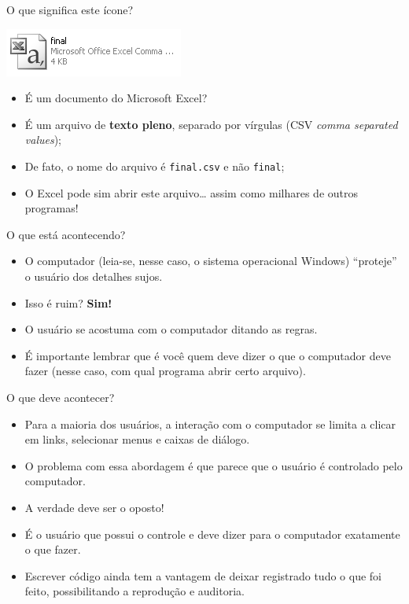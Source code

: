 \documentclass[
  10pt,
  a4paper]{book}
\providecommand{\tightlist}{%
  \setlength{\itemsep}{0pt}\setlength{\parskip}{0pt}}
\begin{document}
O que significa este ícone?

\begin{center}\includegraphics[width=0.5\linewidth]{img/excelcsvgrey} \end{center}

\begin{itemize}
\tightlist
\item
  É um documento do Microsoft Excel?
\item
  É um arquivo de \textbf{texto pleno}, separado por vírgulas (CSV \emph{comma
  separated values});
\item
  De fato, o nome do arquivo é \texttt{final.csv} e não \texttt{final};
\item
  O Excel pode sim abrir este arquivo\ldots{} assim como milhares de outros
  programas!
\end{itemize}

O que está acontecendo?

\begin{itemize}
\tightlist
\item
  O computador (leia-se, nesse caso, o sistema operacional Windows)
  ``proteje'' o usuário dos detalhes sujos.
\item
  Isso é ruim? \textbf{Sim!}
\item
  O usuário se acostuma com o computador ditando as regras.
\item
  É importante lembrar que é você quem deve dizer o que o computador
  deve fazer (nesse caso, com qual programa abrir certo arquivo).
\end{itemize}

O que deve acontecer?

\begin{itemize}
\tightlist
\item
  Para a maioria dos usuários, a interação com o computador se limita a
  clicar em links, selecionar menus e caixas de diálogo.
\item
  O problema com essa abordagem é que parece que o usuário é controlado
  pelo computador.
\item
  A verdade deve ser o oposto!
\item
  É o usuário que possui o controle e deve dizer para o computador
  exatamente o que fazer.
\item
  Escrever código ainda tem a vantagem de deixar registrado tudo o que
  foi feito, possibilitando a reprodução e auditoria.
\end{itemize}
\end{document}
